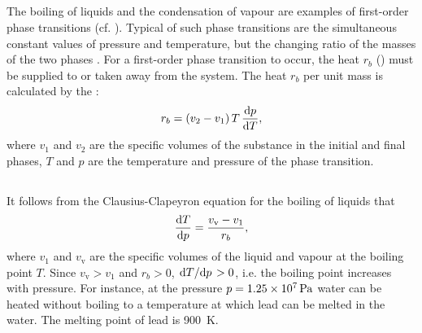 \subsection{}\label{13.6.5} The boiling of liquids and the condensation of vapour are examples of first-order phase transitions (cf. ). Typ­ical of such phase transitions are the simultaneous constant values of pressure and temperature, but the changing ratio of the masses of the two phases . For a first-order phase transition to occur, the heat $r_{b}$ () must be supplied to or taken away from the system. The heat $r_{b}$ per unit mass is calculated by the :
\begin{equation*}%
r_{b} = (v_{2} - v_{1}) \, T \, \dv{p}{T},
\end{equation*}
where $v_{1}$ and $v_{2}$ are the specific volumes of the substance in the initial and final phases, $T$ and $p$ are the temperature and pressure of the phase transition.

\subsection{}\label{13.6.6} It follows from the Clausius-Clapeyron equation for the boiling of liquids that
\begin{equation*}%
\dv{T}{p} = \frac{v_{\text{v}} - v_{1}}{r_{b}},
\end{equation*}
where $v_{1}$ and $v_{\text{v}}$ are the specific volumes of the liquid and vapour at the boiling point $T$. Since $v_{\text{v}} > v_{1}$ and $r_{b} > 0$, $\dv*{T}{p} > 0$, i.e. the boiling point increases with pressure. For instance, at the pressure $p = \SI{1.25d7}{\pascal}$ water can be heated without boiling to a temperature at which lead can be melted in the water. The melting point of lead is \SI{900}{\kelvin}.



